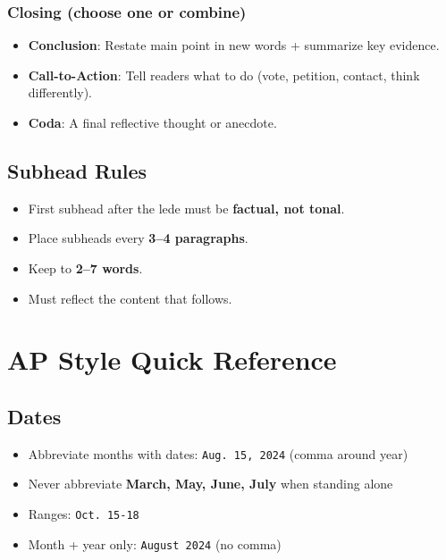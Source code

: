\documentclass[12pt]{article}
\begin{document}
\subsubsection{Closing (choose one or combine)}
\begin{itemize}
    \item \textbf{Conclusion}: Restate main point in new words + summarize key evidence.
    \item \textbf{Call-to-Action}: Tell readers what to do (vote, petition, contact, think differently).
    \item \textbf{Coda}: A final reflective thought or anecdote.
\end{itemize}

\subsection{Subhead Rules}

\begin{itemize}
    \item First subhead after the lede must be \textbf{factual, not tonal}.
    \item Place subheads every \textbf{3--4 paragraphs}.
    \item Keep to \textbf{2--7 words}.
    \item Must reflect the content that follows.
\end{itemize}

\section{AP Style Quick Reference}

\subsection{Dates}
\begin{itemize}
    \item Abbreviate months with dates: \texttt{Aug. 15, 2024} (comma around year)
    \item Never abbreviate \textbf{March, May, June, July} when standing alone
    \item Ranges: \texttt{Oct. 15-18}
    \item Month + year only: \texttt{August 2024} (no comma)
\end{itemize}
\end{document}
